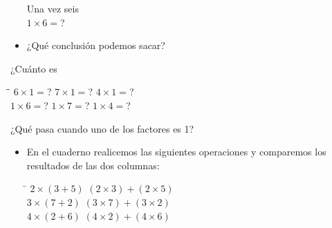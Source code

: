 \documentclass[10pt,twoside]{article}
\begin{document}
\begin{itemize}
\begin{minipage}{.45\textwidth}
Una vez seis\\
$1\times 6=$?
\end{minipage}
\begin{minipage}{.3\textwidth}
\end{minipage}
\item ¿Qué conclusión podemos sacar?
\end{itemize}
¿Cuánto es

\begin{minipage}{.6\textwidth}
\begin{tabbing}
\hspace{2.5cm}\=\hspace{2.5cm}\=\kill
 $6\times 1=$? \> $7\times 1=$? \> $4\times 1=$?\\
 $1\times 6=$? \> $1\times 7=$? \> $1\times 4=$?
\end{tabbing} 
\end{minipage}\hfill
\begin{minipage}{.35\textwidth}
¿Qué pasa cuando uno de los
factores es 1?
\end{minipage}
\begin{itemize}
\item En el cuaderno realicemos las siguientes operaciones y comparemos los resultados de las dos columnas:

\begin{tabbing}
\hspace{3cm}\=\kill
$2\times (3+5)$ \> $(2\times 3)+(2\times 5)$ \\ 
$3\times (7+2)$ \> $(3\times 7)+(3\times 2)$ \\ 
$4\times (2+6)$ \> $(4\times 2)+(4\times 6)$ 
\end{tabbing} 
\end{itemize}
\end{document}
